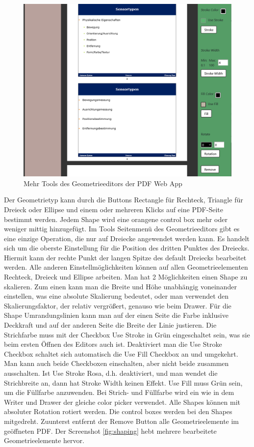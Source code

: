 \begin{figure}[!htbp]
	\centering
	\includegraphics[width=1\textwidth]{"images/shaper2.png"}
	\caption{Mehr Tools des Geometrieeditors der PDF Web App}
	\label{fig:shaper2}
\end{figure}

Der Geometrietyp kann durch die Buttons Rectangle für Rechteck, Triangle für Dreieck oder Ellipse und einem oder mehreren Klicks auf eine PDF-Seite bestimmt werden. Jedem Shape wird eine orangene control box mehr oder weniger mittig hinzugefügt. Im Tools Seitenmenü des Geometrieeditors gibt es eine einzige Operation, die nur auf Dreiecke angewendet werden kann. Es handelt sich um die oberste Einstellung für die Position des dritten Punktes des Dreiecks. Hiermit kann der rechte Punkt der langen Spitze des default Dreiecks bearbeitet werden. Alle anderen Einstellmöglichkeiten können auf allen Geometrieelementen Rechteck, Dreieck und Ellipse arbeiten. Man hat 2 Möglichkeiten einen Shape zu skalieren. Zum einen kann man die Breite und Höhe unabhängig voneinander einstellen, was eine absolute Skalierung bedeutet, oder man verwendet den Skalierungsfaktor, der relativ vergrößert, genauso wie beim Drawer. Für die Shape Umrandungslinien kann man auf der einen Seite die Farbe inklusive Deckkraft und auf der anderen Seite die Breite der Linie justieren. Die Strichfarbe muss mit der Checkbox Use Stroke in Grün eingeschaltet sein, was sie beim ersten Öffnen des Editors auch ist. Deaktiviert man die Use Stroke Checkbox schaltet sich automatisch die Use Fill Checkbox an und umgekehrt. Man kann auch beide Checkboxen einschalten, aber nicht beide zusammen ausschalten. Ist Use Stroke Rosa, d.h. deaktiviert, und man wendet die Strichbreite an, dann hat Stroke Width keinen Effekt. Use Fill muss Grün sein, um die Füllfarbe anzuwenden. Bei Strich- und Füllfarbe wird ein wie in dem Writer und Drawer der gleiche color picker verwendet. Alle Shapes können mit absoluter Rotation rotiert werden. Die control boxes werden bei den Shapes mitgedreht. Zuunterst entfernt der Remove Button alle Geometrieelemente im geöffneten PDF. Der Screenshot \ref{fig:shaping} hebt mehrere bearbeitete Geometrieelemente hervor.

